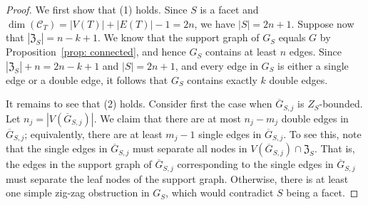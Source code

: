 \begin{proof} 
	





We first show that (1) holds.  
Since $S$ is a facet and $\dim(\mathcal{C}_T) = |V(T)| + |E(T)| - 1 = 2n$, we have  $|S| = 2n+1$. 
Suppose now that $|\mathfrak{Z}_S| = n-k+1$.  
We know that the support graph of  $G_S$ equals $G$ by Proposition~\ref{prop: connected}, and hence $G_S$ contains at least $n$ edges.  
Since $|\mathfrak{Z}_S| + n = 2n-k +1$ and $|S| = 2n+1$, and every edge in $G_S$ is either a single edge or a double edge, it follows that $G_S$ contains exactly $k$ double edges. 

It remains to see that (2) holds. 
Consider first the case when $\overline{G}_{S,j}$ is $Z_S$-bounded.  
Let $n_j = |V(\overline{G}_{S,j})|$. 
We claim that there are at most $n_j - m_j$ double edges in $\overline{G}_{S,j}$; equivalently,  there are at least $m_j - 1$ single edges in $\overline{G}_{S,j}$.  
To see this, note that the single edges in $\overline{G}_{S,j}$ must separate all nodes in $V(\overline{G}_{S,j})\cap\mathfrak{Z}_S$.  
That is, the edges in the support graph of $\overline{G}_{S,j}$ corresponding to the single edges in $\overline{G}_{S,j}$ must separate the leaf nodes of the support graph. 
Otherwise, there is at least one simple zig-zag obstruction in $G_S$, which would contradict $S$ being a facet. 


\end{proof}
